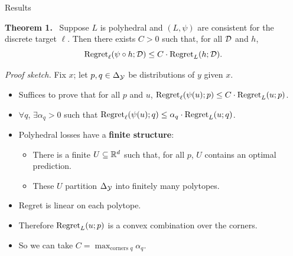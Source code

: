 \documentclass[t,mathserif,12pt,aspectratio=1610,handout]{beamer}
\begin{document}
\begin{frame}{Results}{}
  {\vspace*{-3ex}}
  \begin{block}{\vspace*{-3ex}}
    \textbf{Theorem 1.}~
    Suppose $L$ is polyhedral and $(L,\psi)$ are consistent for the discrete target $\ell$.
    Then there exists $C > 0$ such that, for all $\mathcal{D}$ and $h$,
    \[ \mathrm{Regret}_{\ell}(\psi \circ h; \mathcal{D}) \leq C \cdot \mathrm{Regret}_L(h; \mathcal{D}) . \]
  \end{block}

  \smallskip
  \emph{Proof sketch.}
  Fix $x$; let $p,q \in \Delta_{\mathcal{Y}}$ be distributions of $y$ given $x$.
  \begin{itemize}[<+->]
  \item Suffices to prove that for all $p$ and $u$, $\mathrm{Regret}_{\ell}(\psi(u);p) \leq C \cdot \mathrm{Regret}_L(u;p)$.
  \item $\forall q$, $\exists \alpha_q > 0$ such that $\mathrm{Regret}_{\ell}(\psi(u); q) \leq \alpha_q \cdot \mathrm{Regret}_L(u; q)$.
  \item Polyhedral losses have a \textbf{finite structure}: 
    \begin{itemize}
    \item There is a finite $U \subseteq \mathbb{R}^d$ such that, for all $p$, $U$ contains an optimal prediction.
    \item These $U$ partition $\Delta_{\mathcal{Y}}$ into finitely many polytopes.
    \end{itemize}
  \item Regret is linear on each polytope.
  \item Therefore $\mathrm{Regret}_L(u ; p)$ is a convex combination over the corners.
  \item So we can take $C = \max_{\text{corners $q$}} \alpha_q$.
  \end{itemize}
\end{frame}
\end{document}
